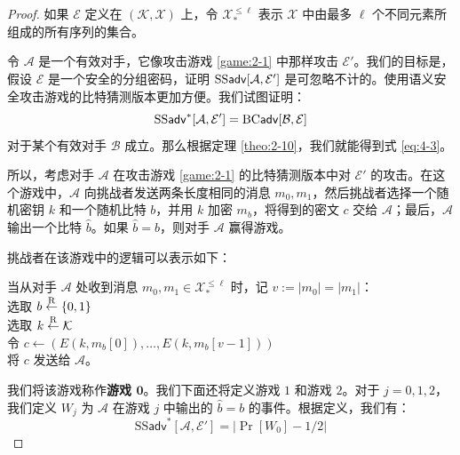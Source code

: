 \begin{proof}
如果 $\mathcal{E}$ 定义在 $(\mathcal{K},\mathcal{X})$ 上，令 $\mathcal{X}_*^{\leq\ell}$ 表示 $\mathcal{X}$ 中由最多 $\ell$ 个不同元素所组成的所有序列的集合。

令 $\mathcal{A}$ 是一个有效对手，它像攻击游戏 \ref{game:2-1} 中那样攻击 $\mathcal{E}'$。我们的目标是，假设 $\mathcal{E}$ 是一个安全的分组密码，证明 ${\rm SS\mathsf{adv}}[\mathcal{A},\mathcal{E}']$ 是可忽略不计的。使用语义安全攻击游戏的比特猜测版本更加方便。我们试图证明：
\begin{equation}\label{eq:4-4}
{\rm SS\mathsf{adv}}^*[\mathcal{A},\mathcal{E}']={\rm BC\mathsf{adv}}[\mathcal{B},\mathcal{E}]
\end{equation}
对于某个有效对手 $\mathcal{B}$ 成立。那么根据定理 \ref{theo:2-10}，我们就能得到式 \ref{eq:4-3}。

所以，考虑对手 $\mathcal{A}$ 在攻击游戏 \ref{game:2-1} 的比特猜测版本中对 $\mathcal{E}'$ 的攻击。在这个游戏中，$\mathcal{A}$ 向挑战者发送两条长度相同的消息 $m_0,m_1$，然后挑战者选择一个随机密钥 $k$ 和一个随机比特 $b$，并用 $k$ 加密 $m_b$，将得到的密文 $c$ 交给 $\mathcal{A}$；最后，$\mathcal{A}$ 输出一个比特 $\hat b$。如果 $\hat b=b$，则对手 $\mathcal{A}$ 赢得游戏。

挑战者在该游戏中的逻辑可以表示如下：

\vspace*{10pt}

\hspace*{5pt} 当从对手 $\mathcal{A}$ 处收到消息 $m_0,m_1\in\mathcal{X}_*^{\leq\ell}$ 时，记 $v:=|m_0|=|m_1|$：\\
\hspace*{50pt} 选取 $b\overset{\rm R}\leftarrow\{0,1\}$\\
\hspace*{50pt} 选取 $k\overset{\rm R}\leftarrow\mathcal{K}$\\
\hspace*{50pt} 令 $c\leftarrow(E(k,m_b[0]),\dots,E(k, m_b[v-1]))$\\
\hspace*{50pt} 将 $c$ 发送给 $\mathcal{A}$。

\vspace*{10pt}

我们将该游戏称作\textbf{游戏 $\mathbf{0}$}。我们下面还将定义游戏 $1$ 和游戏 $2$。对于 $j=0,1,2$，我们定义 $W_j$ 为 $\mathcal{A}$ 在游戏 $j$ 中输出的 $\hat b=b$ 的事件。根据定义，我们有：
\begin{equation}\label{eq:4-5}
\mathrm{SS}\mathsf{adv}^*[\mathcal{A},\mathcal{E}']
=
|\Pr[W_0]-{1}/{2}|
\end{equation}


\end{proof}
